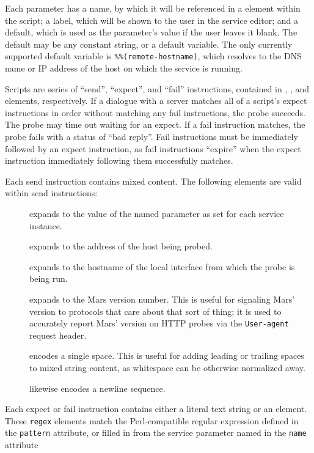 \documentclass{article}
\newcommand{\identifier}[1]{{\tt #1}}
\newcommand{\xelement}[1]{{\tt <#1>}}
\begin{document}
Each parameter has a name, by which it will be referenced in a
\xelement{mdef:param} element within the script; a label, which will be shown
to the user in the service editor; and a default, which is used as the
parameter's value if the user leaves it blank. The default may be any constant
string, or a default variable. The only currently supported default variable is
\identifier{\%\%(remote-hostname)}, which resolves to the DNS name or IP
address of the host on which the service is running.

Scripts are series of ``send'', ``expect'', and ``fail''
instructions, contained in \xelement{mdef:send}, \xelement{mdef:expect}, and
\xelement{mdef:fail} elements, respectively. If a dialogue with a server
matches all of a script's expect instructions in order without matching any
fail instructions, the probe succeeds.  The probe may time out waiting for an
expect. If a fail instruction matches, the probe fails with a status of ``bad
reply''. Fail instructions must be immediately followed by an expect
instruction, as fail instructions ``expire'' when the expect instruction
immediately following them successfully matches.

Each send instruction contains mixed content. The following elements are valid
within send instructions:

\begin{description}
\item[\xelement{mdef:param name}] expands to the value of the named parameter
as set for each service instance.
\item[\xelement{mdef:remote-hostname}] expands to the address of the host being
probed.
\item[\xelement{mdef:local-hostname}] expands to the hostname of the local
interface from which the probe is being run.
\item[\xelement{mdef:version}] expands to the Mars version number. This is
useful for signaling Mars' version to protocols that care about that sort of
thing; it is used to accurately report Mars' version on HTTP probes via the
\identifier{User-agent} request header.
\item[\xelement{mdef:space}] encodes a single space. This is useful for adding
leading or trailing spaces to mixed string content, as whitespace can be
otherwise normalized away.
\item[\xelement{mdef:crlf}] likewise encodes a newline sequence.
\end{description}

Each expect or fail instruction contains either a literal text string
or an \xelement{mdef:regex} element. These \identifier{regex}
elements match the Perl-compatible regular expression defined in the
\identifier{pattern} attribute, or filled in from the service
parameter named in the \identifier{name} attribute
\end{document}
